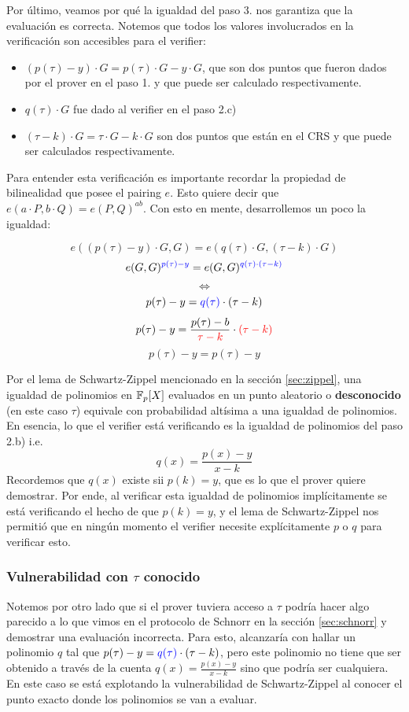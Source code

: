 Por último, veamos por qué la igualdad del paso $3.$ nos garantiza que la evaluación es correcta. Notemos que todos los valores involucrados en la verificación son accesibles para el verifier:
\begin{itemize}
    \item $(p(\tau)-y)\cdot G = p(\tau)\cdot G-y\cdot G$, que son dos puntos que fueron dados por el prover en el paso 1. y que puede ser calculado respectivamente.
    \item $q(\tau)\cdot G$ fue dado al verifier en el paso 2.c)
    \item $(\tau - k)\cdot G = \tau \cdot G - k\cdot G$ son dos puntos que están en el CRS y que puede ser calculados respectivamente. 
\end{itemize}

Para entender esta verificación es importante recordar la propiedad de bilinealidad que posee el pairing $e$. Esto quiere decir que $e(a\cdot P, b \cdot Q) = e(P,Q)^{ab}$. Con esto en mente, desarrollemos un poco la igualdad:

$$e((p(\tau)-y)\cdot G, G) = e(q(\tau)\cdot G, (\tau - k)\cdot G)$$
$$e(G, G)^{\textcolor{blue}{p(\tau)-y}} = e(G, G)^{\textcolor{blue}{q(\tau)\cdot (\tau - k)}}$$
$$\Longleftrightarrow$$
$$p(\tau)-y = \textcolor{blue}{q(\tau)}\cdot (\tau - k)$$
$$p(\tau)-y = \frac{p(\tau) - b}{\textcolor{red}{\tau - k}} \cdot \textcolor{red}{(\tau - k)}$$
$$p(\tau)-y = p(\tau) - y$$


Por el lema de  Schwartz-Zippel mencionado en la sección \ref{sec:zippel}, una igualdad de polinomios en $\mathbb{F}_p[X]$
evaluados en un punto aleatorio o \textbf{desconocido} (en este caso $\tau$) equivale con probabilidad altísima a una igualdad de polinomios. En esencia, lo que el verifier está verificando es la igualdad de polinomios del paso 2.b) i.e. 
$$q(x) = \frac{p(x)-y}{x-k}$$
Recordemos que $q(x)$ existe sii $p(k) = y$, que es lo que el prover quiere demostrar. Por ende, al verificar esta igualdad de polinomios implícitamente se está verificando el hecho de que $p(k) = y$, y el lema de Schwartz-Zippel nos permitió que en ningún momento el verifier necesite explícitamente $p$ o $q$ para verificar esto. 


\subsubsection{\textbf{Vulnerabilidad con $\tau$ conocido}}

Notemos por otro lado que si el prover tuviera acceso a $\tau$ podría hacer algo parecido a lo que vimos en el protocolo de Schnorr en la sección \ref{sec:schnorr} y demostrar una evaluación incorrecta. Para esto, alcanzaría con hallar un polinomio $q$ tal que $p(\tau)-y = \textcolor{blue}{q(\tau)}\cdot (\tau - k)$, pero este polinomio no tiene que ser obtenido a través de la cuenta $q(x) = \frac{p(x)-y}{x-k}$ sino que podría ser cualquiera. En este caso se está explotando la vulnerabilidad de Schwartz-Zippel al conocer el punto exacto donde los polinomios se van a evaluar. 

